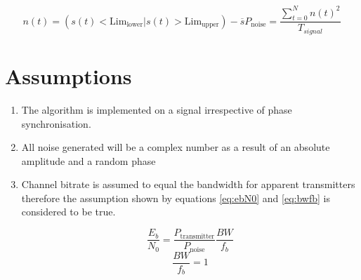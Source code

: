 \begin{multicols}{2}
\begin{subequations}
\begin{equation}
    n(t) = (s(t) < \text{Lim}_{\text{lower}} | s(t) > \text{Lim}_{\text{upper}}) - \overline{s}
    \label{eq:noiseest}
\end{equation}
\begin{equation}
    P_{\text{noise}} = \frac{\sum_{t=0}^{N} n(t)^2}{T_{signal}}
    \label{eq:pnoise}
\end{equation}
\end{subequations}
\end{multicols}

\section{Assumptions}
\begin{enumerate}
    \item The algorithm is implemented on a signal irrespective of phase synchronisation.
    \item All noise generated will be a complex number as a result of an absolute amplitude and a random phase
    \item Channel bitrate is assumed to equal the bandwidth for apparent transmitters therefore the assumption shown by equations \ref{eq:ebN0} and  \ref{eq:bwfb} is considered to be true.
    \begin{multicols}{2}
    \begin{equation}
        \frac{E_b}{N_0} =  \frac{P_{\text{transmitter}}}{P_{\text{noise}}} \frac{BW}{f_b}
        \label{eq:ebN0}
    \end{equation}
    \begin{equation}
    \frac{BW}{f_b} = 1
    \label{eq:bwfb}
    \end{equation}
    \end{multicols}
\end{enumerate}
